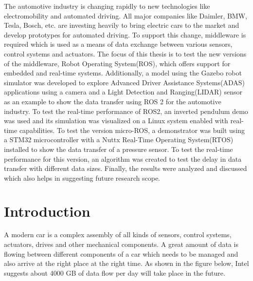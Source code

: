 \documentclass[%
xelatex,
	oneside,		%
	12pt,			%
	parskip=half,	%
	abstracton,
	chapterprefix=true%
    appendixprefix=true]
{scrbook}
\begin{document}
The automotive industry is changing rapidly to new technologies like electromobility and automated driving. All major companies like Daimler, BMW, Tesla, Bosch, etc. are investing heavily to bring electric cars to the market and develop prototypes for automated driving. To support this change, middleware is required which is used as a means of data exchange between various sensors, control systems and actuators. The focus of this thesis is to test the new versions of the middleware, Robot Operating System(ROS), which offers support for embedded and real-time systems. Additionally, a model using the Gazebo robot simulator was developed to explore  Advanced Driver Assistance Systems(ADAS) applications using a camera and a Light Detection and Ranging(LIDAR) sensor as an example to show the data transfer using ROS 2 for the automotive industry. To test the real-time performance of ROS2, an inverted pendulum demo was used and its simulation was visualized on a Linux system enabled with real-time capabilities. To test the version micro-ROS, a demonstrator was built using a STM32 microcontroller with a Nuttx Real-Time Operating System(RTOS) installed to show the data transfer of a pressure sensor. To test the real-time performance for this version, an algorithm was created to test the delay in data transfer with different data sizes. Finally, the results were analyzed and discussed which also helps in suggesting future research scope.
\clearpage

	
\rofoot[\pagemark]{\pagemark}
\printnomenclature
	

	\tableofcontents
	
	


	\chapter{Introduction}

\rofoot[\pagemark]{\pagemark}

A modern car is a complex assembly of all kinds of sensors, control systems, actuators, drives and other mechanical components. A great amount of data is flowing between different components of a car which needs to be managed and also arrive at the right place at the right time. As shown in the figure below, Intel suggests about 4000 GB of data flow per day will take place in the future.
\end{document}
